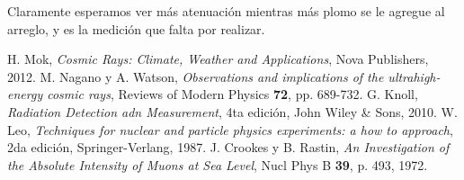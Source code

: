 \documentclass[a4paper,10pt]{article}
\numberwithin{equation}{section}
\begin{document}
Claramente esperamos ver más atenuación mientras más plomo se le agregue al arreglo, 
y es la medición que falta por realizar.

\begin{thebibliography}{10}
H. Mok, \emph{Cosmic Rays: Climate, Weather and Applications}, Nova Publishers, 
2012.
M. Nagano y A. Watson, \emph{Observations and implications of the ultrahigh-energy 
cosmic rays}, Reviews of Modern Physics \textbf{72}, pp. 689-732.
G. Knoll, \emph{Radiation Detection adn Measurement}, 4ta edición, John Wiley \& Sons,
2010.
W. Leo, \emph{Techniques for nuclear and particle physics experiments: a how to 
approach}, 2da edición, Springer-Verlang, 1987.
J. Crookes y B. Rastin, \emph{An Investigation of the Absolute Intensity of Muons at Sea Level}, 
Nucl Phys B \textbf{39}, p. 493, 1972.
\end{thebibliography}
\end{document}

